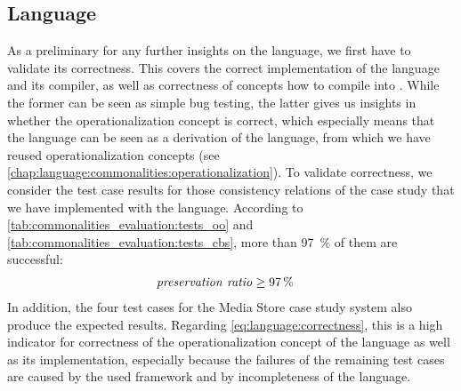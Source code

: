 

\subsection*{\Commonalities Language}

As a preliminary for any further insights on the \commonalities language, we first have to validate its correctness.
This covers the correct implementation of the language and its compiler, as well as correctness of concepts how to compile \commonalities into \reactions.
While the former can be seen as simple bug testing, the latter gives us insights in whether the operationalization concept is correct, which especially means that the language can be seen as a derivation of the \mappings language, from which we have reused operationalization concepts (see \autoref{chap:language:commonalities:operationalization}).
To validate correctness, we consider the test case results for those consistency relations of the case study that we have implemented with the \commonalities language.
According to \autoref{tab:commonalities_evaluation:tests_oo} and \autoref{tab:commonalities_evaluation:tests_cbs}, more than \SI{97}{\percent} of them are successful:
\begin{align*}
    &
    \mathit{preservation\ ratio} \ge \SI{97}{\percent}
\end{align*}
In addition, the four test cases for the Media Store case study system also produce the expected results.
Regarding \autoref{eq:language:correctness}, this is a high indicator for correctness of the operationalization concept of the \commonalities language as well as its implementation, especially because the failures of the remaining test cases are caused by the used \vitruv framework and by incompleteness of the \commonalities language.

